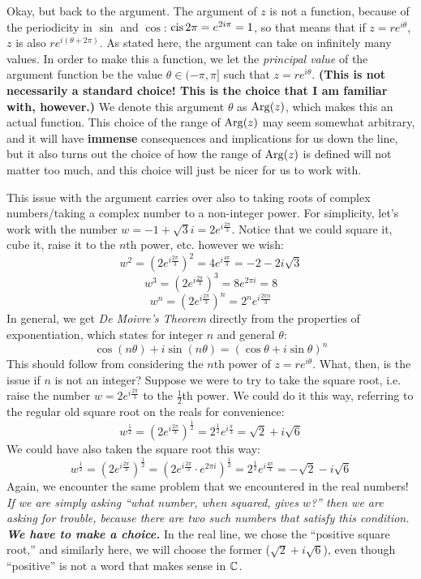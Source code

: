 Okay, but back to the argument. The argument of $z$ is not a function, because of the periodicity in $\sin$ and $\cos$: $\operatorname{cis} 2\pi = e^{2i \pi} = 1$, so that means that if $z = re^{i\theta}$, $z$ is also $re^{i(\theta + 2\pi)}$. As stated here, the argument can take on infinitely many values. In order to make this a function, we let the \textit{principal value} of the argument function be the value $\theta \in (-\pi, \pi]$ such that $z = re^{i\theta}$. \textbf{(This is not necessarily a standard choice! This is the choice that I am familiar with, however.)} We denote this argument $\theta$ as $\operatorname*{Arg}(z)$, which makes this an actual function. This choice of the range of $\operatorname*{Arg}(z)$ may seem somewhat arbitrary, and it will have \textbf{immense} consequences and implications for us down the line, but it also turns out the choice of how the range of $\operatorname*{Arg}(z)$ is defined will not matter too much, and this choice will just be nicer for us to work with.

This issue with the argument carries over also to taking roots of complex numbers/taking a complex number to a non-integer power. For simplicity, let's work with the number $w = -1 + \sqrt{3} i = 2 e^{i\frac{2\pi}{3}}$. Notice that we could square it, cube it, raise it to the $n$th power, etc. however we wish:
\[
    w^2 = \left(2 e^{i\frac{2\pi}{3}} \right)^2 = 4 e^{i \frac{4\pi}{3}} = -2 - 2i \sqrt{3}
\]
\[
    w^3 = \left(2 e^{i\frac{2\pi}{3}}\right)^3 = 8 e^{2\pi i} = 8
\]
\[
    w^n = \left(2 e^{i\frac{2\pi}{3}} \right)^n = 2^n e^{i \frac{2\pi n}{3}}
\]
In general, we get \textit{De Moivre's Theorem} directly from the properties of exponentiation, which states for integer $n$ and general $\theta$:
\[
    \cos(n\theta) + i \sin (n\theta) = \left(\cos \theta + i \sin \theta \right)^n
\]
This should follow from considering the $n$th power of $z = re^{i \theta}$. What, then, is the issue if $n$ is not an integer? Suppose we were to try to take the square root, i.e. raise the number $w = 2 e^{i\frac{2\pi}{3}}$ to the $\frac{1}{2}$th power. We could do it this way, referring to the regular old square root on the reals for convenience:
\[
    w^\frac{1}{2} = \left(2 e^{i\frac{2\pi}{3}} \right)^\frac{1}{2} = 2^\frac{1}{2} e^{i \frac{\pi}{3}} = \sqrt{2} + i \sqrt{6}
\]
We could have also taken the square root this way:
\[
    w^\frac{1}{2} = \left(2 e^{i\frac{2\pi}{3}} \right)^\frac{1}{2} = \left(2 e^{i\frac{2\pi}{3}} \cdot e^{2\pi i} \right)^\frac{1}{2} = 2^\frac{1}{2} e^{i \frac{4\pi}{3}} = -\sqrt{2} - i \sqrt{6}
\]
Again, we encounter the same problem that we encountered in the real numbers! \textit{If we are simply asking ``what number, when squared, gives $w$?'' then we are asking for trouble, because there are two such numbers that satisfy this condition. \textbf{We have to make a choice.}} In the real line, we chose the ``positive square root,'' and similarly here, we will choose the former ($\sqrt{2} + i \sqrt{6}$), even though ``positive'' is not a word that makes sense in $\mathbb C$.

